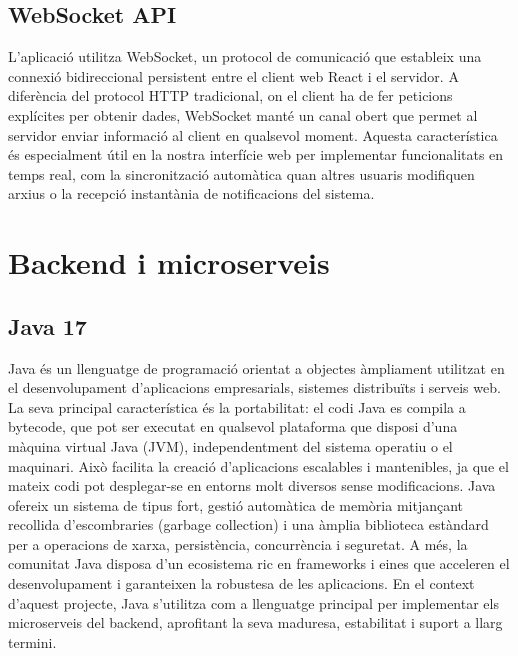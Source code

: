 \subsection*{WebSocket API}
L'aplicació utilitza WebSocket, un protocol de comunicació que estableix una connexió bidireccional persistent entre el client web React i el servidor. A diferència del protocol HTTP tradicional, on el client ha de fer peticions explícites per obtenir dades, WebSocket manté un canal obert que permet al servidor enviar informació al client en qualsevol moment. Aquesta característica és especialment útil en la nostra interfície web per implementar funcionalitats en temps real, com la sincronització automàtica quan altres usuaris modifiquen arxius o la recepció instantània de notificacions del sistema.

\section{Backend i microserveis}

\subsection*{Java 17}
Java és un llenguatge de programació orientat a objectes àmpliament utilitzat en el desenvolupament d'aplicacions empresarials, sistemes distribuïts i serveis web. La seva principal característica és la portabilitat: el codi Java es compila a bytecode, que pot ser executat en qualsevol plataforma que disposi d'una màquina virtual Java (JVM), independentment del sistema operatiu o el maquinari. Això facilita la creació d'aplicacions escalables i mantenibles, ja que el mateix codi pot desplegar-se en entorns molt diversos sense modificacions. Java ofereix un sistema de tipus fort, gestió automàtica de memòria mitjançant recollida d'escombraries (garbage collection) i una àmplia biblioteca estàndard per a operacions de xarxa, persistència, concurrència i seguretat. A més, la comunitat Java disposa d'un ecosistema ric en frameworks i eines que acceleren el desenvolupament i garanteixen la robustesa de les aplicacions. En el context d'aquest projecte, Java s'utilitza com a llenguatge principal per implementar els microserveis del backend, aprofitant la seva maduresa, estabilitat i suport a llarg termini.

